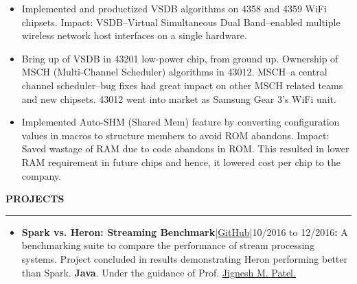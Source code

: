 \documentclass[a4paper, 10pt]{extarticle}
\begin{document}
\begin{large}
\begin{itemize}
    \item{Implemented and productized VSDB algorithms on 4358 and 4359 WiFi chipsets. Impact: VSDB--Virtual Simultaneous Dual Band--enabled multiple wireless network host interfaces on a single hardware.}
    
    \item{Bring up of VSDB in 43201 low-power chip, from ground up. Ownership of MSCH (Multi-Channel Scheduler) algorithms in 43012. MSCH--a central channel scheduler--bug fixes had great impact on other MSCH related teams and new chipsets. 43012 went into market as Samsung Gear 3's WiFi unit.}
    \item{Implemented Auto-SHM (Shared Mem) feature by converting configuration values in macros to structure members to avoid ROM abandons. Impact: Saved wastage of RAM due to code abandons in ROM. This resulted in lower RAM requirement in future chips and hence, it lowered cost per chip to the company.}
\end{itemize}

\vspace{.1cm}
\begin{flushleft}
{\LARGE{\textbf{P}}\Large{\textbf{ROJECTS}}}
\end{flushleft}
\vspace{-0.1cm}\hrule %

\begin{itemize}
    \setlength\itemsep{-0.02 cm}
    \item{\textbf{Spark vs. Heron: Streaming Benchmark}|\href{https://github.com/rdamkondwar/Streaming-Benchmark}{GitHub}|10/2016 to 12/2016\textbf{{\Large{:}}} A benchmarking suite to compare the performance of  stream processing systems. Project concluded in results demonstrating Heron performing better than Spark. \textbf{Java}. Under the guidance of Prof. \href{http://pages.cs.wisc.edu/~jignesh/}{Jignesh M. Patel.}}
    
    

\end{itemize}
\end{large}
\end{document}
